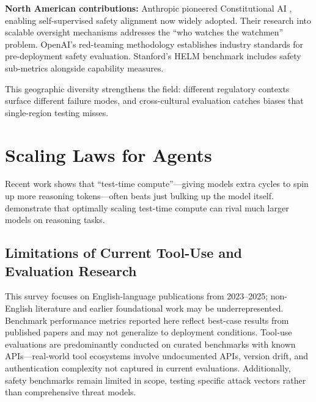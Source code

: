\documentclass[12pt,a4paper]{report}
\theoremstyle{definition}
\begin{document}
\textbf{North American contributions:} Anthropic pioneered Constitutional AI \cite{bai2022constitutional}, enabling self-supervised safety alignment now widely adopted. Their research into scalable oversight mechanisms addresses the ``who watches the watchmen'' problem. OpenAI's red-teaming methodology establishes industry standards for pre-deployment safety evaluation. Stanford's HELM benchmark includes safety sub-metrics alongside capability measures.

This geographic diversity strengthens the field: different regulatory contexts surface different failure modes, and cross-cultural evaluation catches biases that single-region testing misses.

\section{Scaling Laws for Agents}
Recent work shows that ``test-time compute''---giving models extra cycles to spin up more reasoning tokens---often beats just bulking up the model itself. \citet{snell2024scaling} demonstrate that optimally scaling test-time compute can rival much larger models on reasoning tasks.

\subsection{Limitations of Current Tool-Use and Evaluation Research}
This survey focuses on English-language publications from 2023--2025; non-English literature and earlier foundational work may be underrepresented. Benchmark performance metrics reported here reflect best-case results from published papers and may not generalize to deployment conditions. Tool-use evaluations are predominantly conducted on curated benchmarks with known APIs---real-world tool ecosystems involve undocumented APIs, version drift, and authentication complexity not captured in current evaluations. Additionally, safety benchmarks remain limited in scope, testing specific attack vectors rather than comprehensive threat models.
\end{document}
